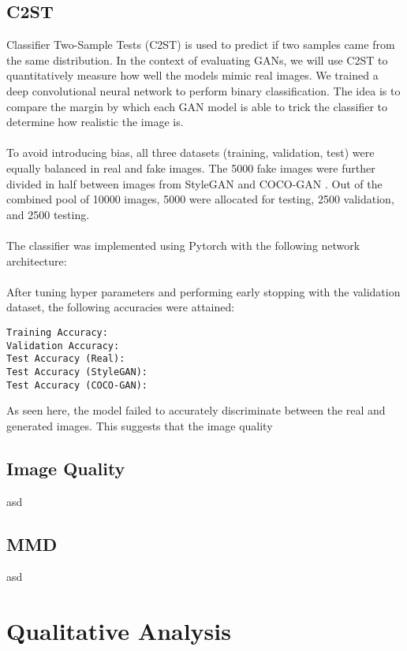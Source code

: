 \documentclass[12pt]{article}
\begin{document}
\begin{multicols*}{2}
        \subsection{C2ST}
        \label{subsec:c2st}
        Classifier Two-Sample Tests (C2ST) is used to predict if two samples came from the same distribution\cite{c2st}.
        In the context of evaluating GANs, we will use C2ST to quantitatively measure how well the models mimic real images.
        We trained a deep convolutional neural network to perform binary classification.
        The idea is to compare the margin by which each GAN model is able to trick the classifier to determine how realistic the image is.
        \\\\
        To avoid introducing bias, all three datasets (training, validation, test) were equally balanced in real and fake images.
        The 5000 fake images were further divided in half between images from StyleGAN and COCO-GAN .
        Out of the combined pool of 10000 images, 5000 were allocated for testing, 2500 validation, and 2500 testing.
        \\\\
        The classifier was implemented using Pytorch with the following network architecture:
        \\[insert some stuff here]\\
        After tuning hyper parameters and performing early stopping with the validation dataset, the following accuracies were attained:
        \begin{verbatim}Training Accuracy:
Validation Accuracy:
Test Accuracy (Real):
Test Accuracy (StyleGAN):
Test Accuracy (COCO-GAN):\end{verbatim}
        As seen here, the model failed to accurately discriminate between the real and generated images.
        This suggests that the image quality

        \subsection{Image Quality}
        \label{subsec:imageQuality}
        asd
        \subsection{MMD}
        \label{subsec:mmd}
        asd

        \section{Qualitative Analysis}
        \label{sec:qualitative}

\end{multicols*}
\end{document}
